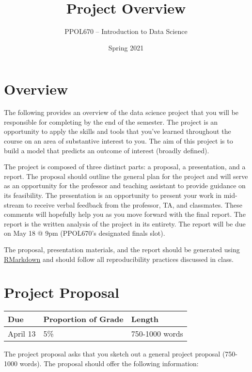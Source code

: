 \documentclass[
  12pt,
]{article}
\title{\textbf{Project Overview}}
\author{\Large PPOL670 -- Introduction to Data Science}
\date{Spring 2021}
\begin{document}
\maketitle

{
\setcounter{tocdepth}{3}
\tableofcontents
}
\hypertarget{overview}{%
\section{Overview}\label{overview}}

The following provides an overview of the data science project that you
will be responsible for completing by the end of the semester. The
project is an opportunity to apply the skills and tools that you've
learned throughout the course on an area of substantive interest to you.
The aim of this project is to build a model that predicts an outcome of
interest (broadly defined).

The project is composed of three distinct parts: a proposal, a
presentation, and a report. The proposal should outline the general plan
for the project and will serve as an opportunity for the professor and
teaching assistant to provide guidance on its feasibility. The
presentation is an opportunity to present your work in mid-stream to
receive verbal feedback from the professor, TA, and classmates. These
comments will hopefully help you as you move forward with the final
report. The report is the written analysis of the project in its
entirety. The report will be due on May 18 @ 9pm (PPOL670's designated
finals slot).

The proposal, presentation materials, and the report should be generated
using
\href{https://rmarkdown.rstudio.com/authoring_quick_tour.html}{RMarkdown}
and should follow all reproducibility practices discussed in class.

\hypertarget{project-proposal}{%
\section{Project Proposal}\label{project-proposal}}

\begin{longtable}[]{@{}lll@{}}
\toprule
\textbf{Due} & \textbf{Proportion of Grade} &
\textbf{Length}\tabularnewline
\midrule
\endhead
April 13 & 5\% & 750-1000 words\tabularnewline
\bottomrule
\end{longtable}

The project proposal asks that you sketch out a general project proposal
(750-1000 words). The proposal should offer the following information:
\end{document}
